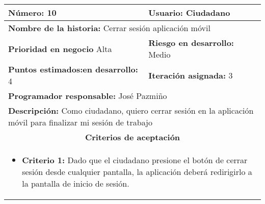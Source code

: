 \begin{longtable}{|p{6.7cm}|p{6.7cm}|}
    \textbf{Número:} 10                                 & \textbf{Usuario:} Ciudadano                                                                   \\
    \hline
    \multicolumn{2}{|l|}{\textbf{Nombre de la historia:} Cerrar sesión aplicación móvil}                                                                \\
    \hline
    \textbf{Prioridad en negocio}  Alta                 & \textbf{Riesgo en desarrollo:} Medio                                                          \\
    \hline
    \textbf{\textbf{Puntos estimados:}en desarrollo:} 4 & \textbf{Iteración asignada:} 3                                                                \\
    \hline
    \multicolumn{2}{|l|}{\textbf{Programador responsable:} José Pazmiño }                                                                               \\
    \hline
    \multicolumn{2}{|p{13.4cm}|}{\textbf{Descripción:} Como ciudadano, quiero cerrar sesión en la aplicación móvil para finalizar mi sesión de trabajo} \\
    \hline
    \multicolumn{2}{|c|}{\textbf{Criterios de aceptación}}                                                                                              \\
    \hline
    \multicolumn{2}{|p{13.4cm}|}{
    \begin{itemize}[label={},leftmargin=*, nosep]
        \item \textbf{Criterio 1:} Dado que el ciudadano presione el botón de cerrar sesión desde cualquier pantalla, la aplicación deberá redirigirlo a la pantalla de inicio de sesión.
    \end{itemize}
    }                                                                                                                                                   \\
\end{longtable}





